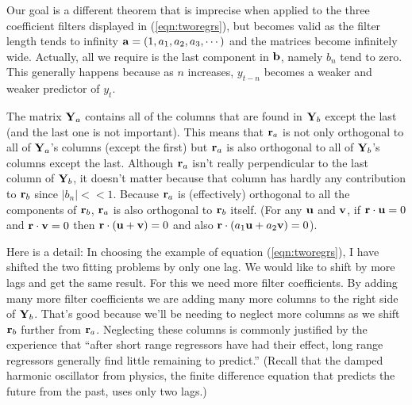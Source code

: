 \par
Our goal is a different theorem that is imprecise when applied
to the three coefficient filters displayed in (\ref{eqn:tworegrs}),
but becomes valid as the filter length tends to infinity
$\bold a = (1,a_1, a_2, a_3,\cdots)$
and the matrices become infinitely wide.
Actually, all we require is the last component in $\bold b$,
namely $b_n$ tend to zero.
This generally happens because as $n$ increases,
$y_{t-n}$ becomes a weaker and weaker predictor of $y_t$.

\par
The matrix $\bold Y_a$ contains
all of the columns that are found in $\bold Y_b$
except the last (and the last one is not important).
This means that $\bold r_a$ is not only orthogonal to all
of $\bold Y_a$'s columns (except the first)
but $\bold r_a$ is also orthogonal to all of
$\bold Y_b$'s columns except the last.
Although $\bold r_a$ isn't really perpendicular to the last column
of $\bold Y_b$, it doesn't matter because that column
has hardly any contribution to $\bold r_b$
since $|b_n|<<1$.
Because $\bold r_a$ is (effectively)
orthogonal to all the components of $\bold r_b$,
$\bold r_a$ is also orthogonal to $\bold r_b$ itself.
(For any $\bold u$ and $\bold v$, if
$\bold r\cdot \bold u=0$ and
$\bold r\cdot \bold v=0$ then
$\bold r\cdot (\bold u+ \bold v)=0$ and also
$\bold r\cdot (a_1\bold u + a_2\bold v)=0$).
\par
Here is a detail:
In choosing the example of equation (\ref{eqn:tworegrs}),
I have shifted the two fitting problems by only one lag.
We would like to shift by more lags and get the same result.
For this we need more filter coefficients.
By adding many more filter coefficients we are adding many more columns
to the right side of $\bold Y_b$.
That's good because we'll be needing to neglect more columns
as we shift $\bold r_b$ further from $\bold r_a$.
Neglecting these columns is commonly justified by the experience
that ``after short range regressors have had their effect,
long range regressors generally find little remaining to predict.''
(Recall that the damped harmonic oscillator from physics,
the finite difference equation that predicts the future from the past,
uses only two lags.)

